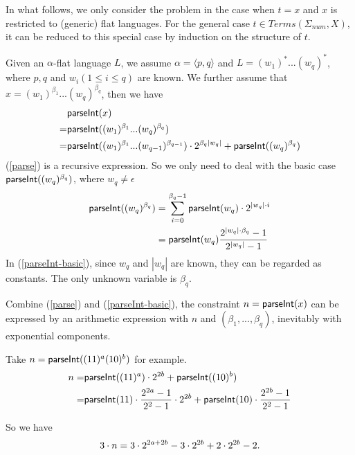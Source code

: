 In what follows, we only  consider the problem in the case when $t=x$ and $x$ is restricted to (generic) flat languages. 
For the general case $t\in \textit{Terms}(\Sigma_{\textit{num}},X)$, 
it can be reduced to this special case by induction on the structure of $t$. 

Given an $\alpha$-flat language $L$,
we assume $\alpha=\langle p,q \rangle$ and $L=(w_1)^*...(w_q)^*$,
where $p,q$ and $w_i(1\le i \le q) $ are known.
We further assume that $x = (w_1)^{\beta_1} ... (w_q)^{\beta_q}$,
then we have
\begin{align}
    &{\textsf{parseInt}}(x) \notag \\
    =&{\textsf{parseInt}}((w_1)^{\beta_1} ... (w_q)^{\beta_q}) \notag \\
    =&{\textsf{parseInt}}((w_1)^{\beta_1} ... (w_{q-1})^{\beta_{q-1}})\cdot 2^{\beta_q |w_q|}
    + {\textsf{parseInt}}((w_q)^{\beta_q}) \label{parse}
\end{align}
(\ref{parse}) is a recursive expression.
So we only need to deal with the basic case ${\textsf{parseInt}}((w_q)^{\beta_q})$, 
where $w_q \neq \epsilon$
\begin{align}
    {\textsf{parseInt}}((w_q)^{\beta_q}) &= \sum_{i=0}^{\beta_q-1} {\textsf{parseInt}}(w_q)\cdot 2^{|w_q|\cdot i}  \notag \\
    &={\textsf{parseInt}}(w_q)\frac{2^{|w_q|\cdot \beta_q}-1}{2^{|w_q|}-1}
    \label{parseInt-basic}
\end{align}
In (\ref{parseInt-basic}), since $w_q$ and $|w_q|$ are known, 
they can be regarded as constants.
The only unknown variable is $\beta_q$.

Combine (\ref{parse}) and (\ref{parseInt-basic}),
the constraint $n={\textsf{parseInt}}(x)$ can be expressed by an arithmetic expression with 
$n$ and $(\beta_1,...,\beta_q)$,
inevitably with exponential components.

Take $n={\textsf{parseInt}}((11)^a(10)^b)$ for example.
\begin{align}
    n=& {\textsf{parseInt}}((11)^a)\cdot 2^{2b} + {\textsf{parseInt}}((10)^b) \notag \\
    =& {\textsf{parseInt}}(11)\cdot \frac{2^{2a}-1}{2^2-1}\cdot 2^{2b} + 
    {\textsf{parseInt}}(10) \cdot \frac{2^{2b}-1}{2^2-1} \notag 
\end{align}

So we have 
\begin{equation}
    3\cdot n = 3\cdot 2^{2a+2b}-3\cdot 2^{2b}+2\cdot 2^{2b}-2. \notag
\end{equation}

